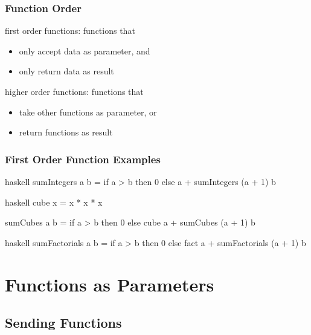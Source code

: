 \documentclass[dvipsnames]{beamer}
\theoremstyle{plain}
\begin{document}
\begin{frame}[fragile]
  \frametitle{Function Order}

  \begin{definition}
    \alert{first order functions}: functions that\\
    \begin{itemize}
      \item only accept data as parameter, and
      \item only return data as result
    \end{itemize}

    \bigskip
    \alert{higher order functions}: functions that
    \begin{itemize}
      \item take other functions as parameter, or
      \item return functions as result
    \end{itemize}
  \end{definition}
\end{frame}

\begin{frame}[fragile]
  \frametitle{First Order Function Examples}

  \begin{example}[Haskell]
    \begin{pygments}{haskell}
sumIntegers a b =
    if a > b then 0 else a + sumIntegers (a + 1) b
    \end{pygments}

    \pause
    \bigskip
    \begin{pygments}{haskell}
cube x = x * x * x

sumCubes a b =
    if a > b then 0 else cube a + sumCubes (a + 1) b
    \end{pygments}

    \pause
    \bigskip
    \begin{pygments}{haskell}
sumFactorials a b =
    if a > b then 0 else fact a + sumFactorials (a + 1) b
    \end{pygments}
  \end{example}
\end{frame}

\section{Functions as Parameters}

\subsection{Sending Functions}
\end{document}
